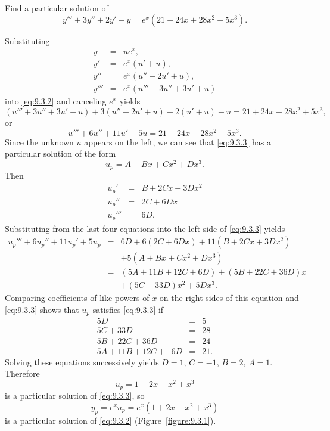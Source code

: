 \setcounter{example}{0}
\setcounter{equation}{1}
\begin{example}
  \label{example:9.3.1} \rm Find a particular solution of
  \begin{equation}
    \label{eq:9.3.2}y'''+3y''+2y'-y=e^{x}(21+24x+28x^{2}+5x^{3}).
  \end{equation}
\end{example}
\setcounter{equation}{2}
\setcounter{figure}{0}
\begin{examplesolution}
\solution Substituting
\begin{eqnarray*}
  y    & = & ue^{x},           \\
  y'   & = & e^{x}(u'+u),      \\
  y''  & = & e^{x}(u''+2u'+u), \\
  y''' & = & e^{x}(u'''+3u''+3u'+u)
\end{eqnarray*}
into \eqref{eq:9.3.2} and canceling $e^{x}$ yields
\[
  (u'''+3u''+3u'+u)+3(u''+2u'+u)+2(u'+u)-u =21+24x+28x^{2}+5x^{3},
\]
or
\begin{equation}
  \label{eq:9.3.3}u'''+6u''+11u'+5u=21+24x+28x^{2}+5x^{3}.
\end{equation}
Since the unknown $u$ appears on the left, we can see that \eqref{eq:9.3.3} has a particular
solution of the form
\[
  u_{p}=A+Bx+Cx^{2}+Dx^{3}.
\]
Then
\begin{eqnarray*}
  u_{p}'   & = & B+2Cx+3Dx^{2} \\
  u_{p}''  & = & 2C+6Dx        \\
  u_{p}''' & = & 6D.
\end{eqnarray*}
Substituting from the last four equations into the left side of \eqref{eq:9.3.3} yields
\begin{eqnarray*}
  u_{p}'''+6u_{p}''+11u_{p}'+5u_{p} & = & 6D+6(2C+6Dx)+11(B+2Cx+3Dx^{2}) \\
                                    &   & +5(A+Bx+Cx^{2}+Dx^{3})         \\
                                    & = & (5A+11B+12C+6D)+(5B+22C+36D)x  \\
                                    &   & +(5C+33D)x^{2}+5Dx^{3}.
\end{eqnarray*}
Comparing coefficients of like powers of $x$ on the right sides of this equation and
\eqref{eq:9.3.3} shows that $u_{p}$ satisfies \eqref{eq:9.3.3} if
\[
  \begin{array}{rcr}
    5D                       & = & 5\phantom{.}  \\
    5C+33D                   & = & 28\phantom{.} \\
    5B+22C+36D               & = & 24\phantom{.} \\
    5A+11B+12C+\phantom{3}6D & = & 21.
  \end{array}
\]
Solving these equations successively yields $D=1$, $C=-1$, $B=2$, $A=1$. Therefore
\[
  u_{p}=1+2x-x^{2}+x^{3}
\]
is a particular solution of \eqref{eq:9.3.3}, so
\[
  y_{p}=e^{x}u_{p}=e^{x}(1+2x-x^{2}+x^{3})
\]
is a particular solution of \eqref{eq:9.3.2} (Figure~\ref{figure:9.3.1}).


\end{examplesolution}
